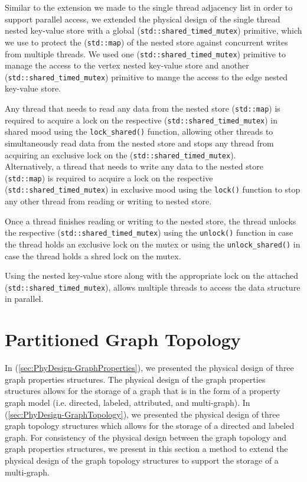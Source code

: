 {Similar to the extension we made to the single thread adjacency list in order to support parallel access, we extended the physical design of the single thread nested key-value store with a global (\texttt{std::shared\_timed\_mutex}) primitive, which we use to protect the (\texttt{std::map}) of the nested store against concurrent writes from multiple threads. We used one (\texttt{std::shared\_timed\_mutex}) primitive to manage the access to the vertex nested key-value store and another (\texttt{std::shared\_timed\_mutex}) primitive to mange the access to the edge nested key-value store.

Any thread that needs to read any data from the nested store (\texttt{std::map}) is required to acquire a lock on the respective (\texttt{std::shared\_timed\_mutex}) in shared mood using the \texttt{lock\_shared()} function, allowing other threads to simultaneously read data from the nested store and stops any thread from acquiring an exclusive lock on the (\texttt{std::shared\_timed\_mutex}). 
\\
Alternatively, a thread that needs to write any data to the nested store (\texttt{std::map}) is required to acquire a lock on the respective (\texttt{std::shared\_timed\_mutex}) in exclusive mood using the \texttt{lock()} function to stop any other thread from reading or writing to nested store. 

Once a thread finishes reading or writing to the nested store, the thread unlocks the respective (\texttt{std::shared\_timed\_mutex}) using the  \texttt{unlock()} function in case the thread holds an exclusive lock on the mutex or using the  \texttt{unlock\_shared()} in case the thread holds a shred lock on the mutex.

Using the nested key-value store along with the appropriate lock on the attached (\texttt{std::shared\_timed\_mutex}), allows multiple threads to access the data structure in parallel.


\section{Partitioned Graph Topology}
\label{sec:PhyDesign-GraphPartitioning}

In (\ref{sec:PhyDesign-GraphProperties}), we presented the physical design of three graph properties structures. The physical design of the graph properties structures allows for the storage of a graph that is in the form of a property graph model (i.e. directed, labeled, attributed, and multi-graph). In (\ref{sec:PhyDesign-GraphTopology}), we presented the physical design of three graph topology structures which allows for the storage of a directed and labeled graph. For consistency of the physical design between the graph topology and graph properties structures, we present in this section a method to extend the physical design of the graph topology structures to support the storage of a multi-graph.

}
